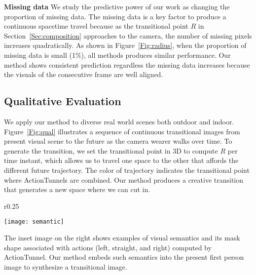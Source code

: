 \documentclass[10pt,twocolumn,letterpaper]{article}
\begin{document}
\noindent\textbf{Missing data} We study the predictive power of our work as changing the proportion of missing data. The missing data is a key factor to produce a continuous spacetime travel because as the transitional point $R$ in Section~\ref{Sec:composition} approaches to the camera, the number of missing pixels increases quadratically. As shown in Figure~\ref{Fig:radius}, when the proportion of missing data is small (1\%), all methods produces similar performance. Our method shows consistent prediction regardless the missing data increases because the visuals of the consecutive frame are well aligned.





\subsection{Qualitative Evaluation}
We apply our method to diverse real world scenes both outdoor and indoor. Figure~\ref{Fig:qual} illustrates a sequence of continuous transitional images from present visual scene to the future as the camera wearer walks over time. To generate the transition, we set the transitional point in 3D to compute $R$ per time instant, which allows us to travel one space to the other that affords the different future trajectory. The color of trajectory indicates the transitional point where ActionTunnels are combined. Our method produces a creative transition that generates a new space where we can cut in.

\begin{wrapfigure}{r}{0.25\textwidth}
\vspace{-8mm}
  \begin{center} 
    \texttt{[image: semantic]}
  \end{center}
    \vspace{-7mm}

\end{wrapfigure}
The inset image on the right shows examples of visual semantics and its mask shape associated with actions (left, straight, and right) computed by ActionTunnel. Our method embeds such semantics into the present first person image to synthesize a transitional image. 
\end{document}
